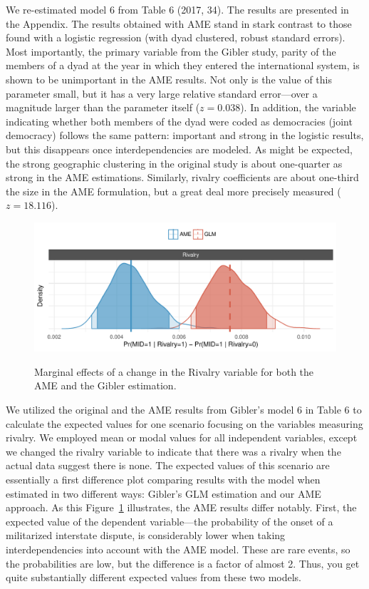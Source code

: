 We re-estimated model 6 from Table 6 (2017, 34). The results are presented in the Appendix. The results obtained with AME stand in stark contrast to those found with a logistic regression (with dyad clustered, robust standard errors).  Most importantly, the primary variable from the Gibler study, parity of the members of a dyad at the year in which they entered the international system, is shown to be unimportant in the AME results.  Not only is the value of this parameter small, but it has a very large relative standard error---over a magnitude larger than the parameter itself ($z= 0.038$). In addition, the variable indicating whether both members of the dyad were coded as democracies (joint democracy) follows the same pattern: important and strong in the logistic results, but this disappears once interdependencies are modeled.  As might be expected, the strong geographic clustering in the original study is about one-quarter as strong in the AME estimations. Similarly, rivalry coefficients are about one-third the size in the AME formulation, but a great deal more precisely measured ($z=18.116$). 

\begin{figure}
	\caption{Marginal effects of a change in the Rivalry variable for both the AME and the Gibler estimation.  \label{fig:gibmargeff}}
	\includegraphics[width=\textwidth]{gibler_margeff.pdf}
 	\label{fig:gibmargeff}
 \end{figure}

We utilized the original and the AME results from Gibler's model 6 in Table 6 to calculate the expected values for one scenario focusing on the variables measuring rivalry.  We employed mean or modal values for all independent variables, except we changed the rivalry variable to indicate that there was a rivalry when the actual data suggest there is none.  The expected values of this scenario are essentially a first difference plot comparing results with the model when estimated in two different ways: Gibler's GLM estimation and our AME approach.  As this Figure~\ref{fig:gibmargeff} illustrates, the AME results differ notably. First, the expected value of the dependent variable---the probability of the onset of a militarized interstate dispute, is considerably lower when taking interdependencies into account with the AME model.  These are rare events, so the probabilities are low, but the difference is a factor of almost 2. Thus, you get quite substantially different expected values from these two models.  

